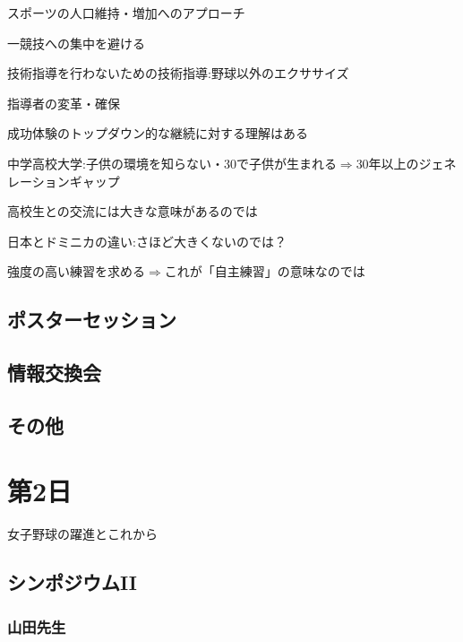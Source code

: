 \documentclass[dvipdfmx, 10.5pt]{jsarticle}
\begin{document}
スポーツの人口維持・増加へのアプローチ

一競技への集中を避ける

技術指導を行わないための技術指導:野球以外のエクササイズ

指導者の変革・確保

成功体験のトップダウン的な継続に対する理解はある

中学高校大学:子供の環境を知らない・30で子供が生まれる$\Rightarrow$30年以上のジェネレーションギャップ

高校生との交流には大きな意味があるのでは

日本とドミニカの違い:さほど大きくないのでは？

強度の高い練習を求める$\Rightarrow$これが「自主練習」の意味なのでは


\subsection{ポスターセッション}

\subsection{情報交換会}

\subsection{その他}

\section{第2日}

女子野球の躍進とこれから

\subsection{シンポジウムII}

\subsubsection{山田先生}
\end{document}
